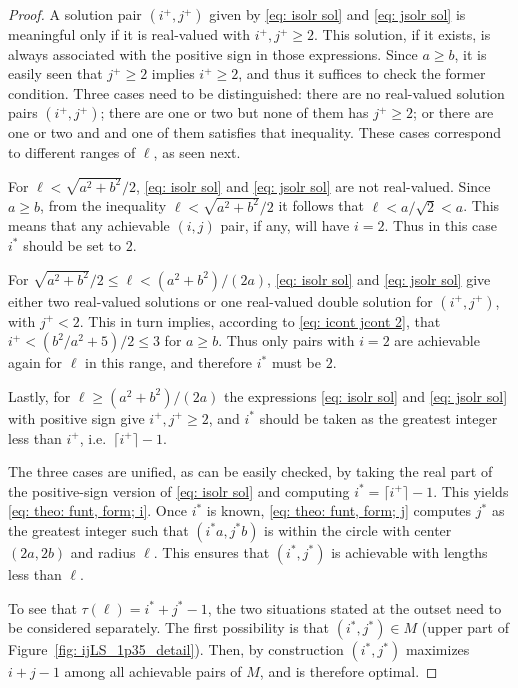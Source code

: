 \documentclass[12pt, a4paper]{article}
\newcommand{\funt}{\tau} %
\newcommand{\len}{\ell} %
\newcommand{\isolr}{i^+}
\newcommand{\jsolr}{j^+}
\newcommand{\isoli}{i^\ast}
\newcommand{\jsoli}{j^\ast}
\newcommand{\mss}{M}
\begin{document}
\begin{proof}
A solution pair $(\isolr, \jsolr)$ given by \eqref{eq: isolr sol} and \eqref{eq: jsolr sol} is meaningful only if it is real-valued with $\isolr, \jsolr \geq 2$. This solution, if it exists, is always associated with the positive sign in those expressions. Since $a \geq b$, it is easily seen that $\jsolr \geq 2$ implies $\isolr \geq 2$, and thus it suffices to check the former condition. Three cases need to be distinguished: there are no real-valued solution pairs $(\isolr, \jsolr)$; there are one or two but none of them has $\jsolr \geq 2$; or there are one or two and and one of them satisfies that inequality. These cases correspond to different ranges of $\len$, as seen next.

For $\len < \sqrt{a^2+b^2}/2$, \eqref{eq: isolr sol} and \eqref{eq: jsolr sol} are not real-valued. Since $a \geq b$, from the inequality $\len < \sqrt{a^2+b^2}/2$ it follows that $\len < a/\sqrt{2} < a$. This means that any achievable $(i,j)$ pair, if any, will have $i=2$. Thus in this case $\isoli$ should be set to $2$.

For $\sqrt{a^2+b^2}/2 \leq \len < (a^2+b^2) / (2a)$, \eqref{eq: isolr sol} and \eqref{eq: jsolr sol} give either two real-valued solutions or one real-valued double solution for $(\isolr, \jsolr)$, with $\jsolr < 2$. This in turn implies, according to \eqref{eq: icont jcont 2}, that $\isolr < (b^2/a^2+5)/2 \leq 3$ for $a \geq b$. Thus only pairs with $i=2$ are achievable again for $\len$ in this range, and therefore $\isoli$ must be $2$.

Lastly, for $\len \geq (a^2+b^2) / (2a)$ the expressions \eqref{eq: isolr sol} and \eqref{eq: jsolr sol} with positive sign give $\isolr, \jsolr \geq 2$, and $\isoli$ should be taken as the greatest integer less than $\isolr$, i.e.~$\lceil \isolr \rceil-1$.
 
The three cases are unified, as can be easily checked, by taking the real part of the positive-sign version of \eqref{eq: isolr sol} and computing $\isoli = \lceil \isolr \rceil-1$. This yields \eqref{eq: theo: funt, form; i}. Once $\isoli$ is known, \eqref{eq: theo: funt, form; j} computes $\jsoli$ as the greatest integer such that $(\isoli a,\jsoli b)$ is within the circle with center $(2a,2b)$ and radius $\len$. This ensures that $(\isoli,\jsoli)$ is achievable with lengths less than $\len$.

To see that $\funt(\len) = \isoli+\jsoli-1$, the two situations stated at the outset need to be considered separately. The first possibility is that $(\isoli,\jsoli) \in \mss$ (upper part of Figure~\ref{fig: ijLS_1p35_detail}). Then, by construction  $(\isoli,\jsoli)$ maximizes $i+j-1$ among all achievable pairs of $\mss$, and is therefore optimal.


\end{proof}
\end{document}

